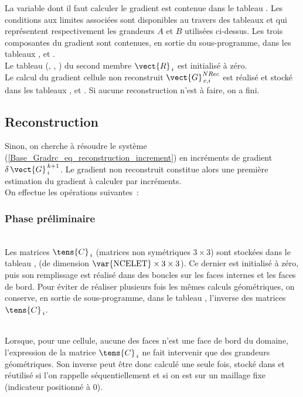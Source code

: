 {La variable dont il faut calculer le gradient est contenue dans le tableau
. Les conditions aux limites associ\'ees sont disponibles au travers
des tableaux  et  qui repr\'esentent respectivement les
grandeurs $A$ et $B$ utilis\'ees ci-dessus. Les trois composantes du gradient
sont contenues, en sortie du sous-programme, dans les tableaux ,
 et .\\

Le tableau (, , ) du second membre $\vect{R}_{\,i}$ est initialis\'e \`a
z\'ero.\\
Le calcul du gradient cellule non reconstruit $\vect{G}^{NRec}_{\,c,i}$ est
r\'ealis\'e et stock\'e dans les tableaux ,  et . Si
aucune reconstruction n'est \`a faire, on a fini.\\
\hspace*{1cm}\subsection*{\bf  Reconstruction}
Sinon, on cherche \`a r\'esoudre le syst\`eme (\ref{Base_Gradrc_eq_reconstruction_increment}) en incr\'ements de
gradient ${\delta\,\vect{G}}^{\,k+1}_{\,i}$. Le gradient non reconstruit
constitue alors une premi\`ere estimation du gradient \`a calculer par
incr\'ements.\\
On effectue les op\'erations suivantes~:
\hspace*{1cm}\subsubsection*{\bf Phase pr\'eliminaire}
\hspace*{1,5cm}{\bf Calcul de la matrice, hors boucle en $k$}\\
Les  matrices $\tens{C}_{\,i}$ (matrices non sym\'etriques $3\times 3$) sont
stock\'ees dans le tableau ,
(de dimension $\text{\var{NCELET}}\times 3\times 3$). Ce dernier est initialis\'e \`a z\'ero,
puis son remplissage est r\'ealis\'e dans des boucles sur les faces internes et
les faces de bord. Pour \'eviter de r\'ealiser plusieurs fois les m\^emes
calculs g\'eom\'etriques, on conserve, en sortie de sous-programme, dans le
tableau , l'inverse des  matrices $\tens{C}_{\,i}$.


\hspace*{2cm}{\bf Cellule ne poss\'edant pas de face de bord }\\
Lorsque, pour une cellule, aucune des faces n'est une face de bord du domaine,
l'expression de la matrice $\tens{C}_{\,i}$ ne fait intervenir que des grandeurs
g\'eom\'etriques. Son inverse peut \^etre donc calcul\'e une seule fois, stock\'e dans
 et r\'eutilis\'e si l'on rappelle  s\'equentiellement et
si on est sur un maillage fixe (indicateur  positionn\'e \`a 0).

}
